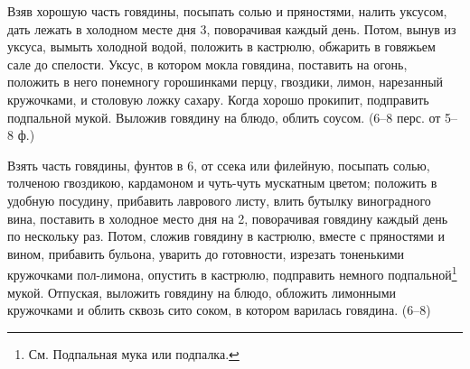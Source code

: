 
Взяв хорошую часть говядины, посыпать солью и пряностями, налить уксусом, дать лежать в холодном месте дня 3, поворачивая каждый день. Потом, вынув из уксуса, вымыть холодной водой, положить в кастрюлю, обжарить в говяжьем сале до спелости. Уксус, в котором мокла говядина, поставить на огонь, положить в него понемногу горошинками перцу, гвоздики, лимон, нарезанный кружочками, и столовую ложку сахару. Когда хорошо прокипит, подправить подпальной мукой. Выложив говядину на блюдо, облить соусом. (6--8 перс. от 5--8 ф.) 


Взять часть говядины, фунтов в 6, от ссека или филейную, посыпать солью, толченою гвоздикою, кардамоном и чуть-чуть мускатным цветом; положить в удобную посудину, прибавить лаврового листу, влить бутылку виноградного вина, поставить в холодное место дня на 2, поворачивая говядину каждый день по нескольку раз. Потом, сложив говядину в кастрюлю, вместе с пряностями и вином, прибавить бульона, уварить до готовности, изрезать тоненькими кружочками пол-лимона, опустить в кастрюлю, подправить немного подпальной\footnote{См. Подпальная мука или подпалка.} мукой. Отпуская, выложить говядину на блюдо, обложить лимонными кружочками и облить сквозь сито соком, в котором варилась говядина. (6--8)